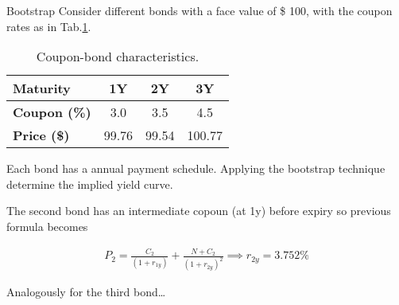 \documentclass{beamer}
\begin{document}
\begin{frame}{}
\begin{block}{Bootstrap}
Consider different bonds with a face value of \$ 100, with the coupon rates as in Tab.\ref{tab:coupons}.

\begin{table}[htb]
  \begin{center}
    \begin{tabular}{|l|c|c|c|}
      \hline
      \textbf{Maturity}    & 1Y    & 2Y     & 3Y     \\ \hline
      \textbf{Coupon (\%)} & 3.0   & 3.5    & 4.5    \\ \hline
      \textbf{Price (\$)}  & 99.76 & 99.54  & 100.77 \\ \hline
    \end{tabular}
    \end{center}
    \caption{Coupon-bond characteristics.}
    \label{tab:coupons}
  \end{table}
Each bond has a annual payment schedule. Applying the bootstrap technique determine the implied yield curve.
\end{block}
\end{frame}

\begin{frame}{}
The second bond has an intermediate copoun (at 1y) before expiry so previous formula becomes

\begin{equation*}
  \begin{gathered}
    P_2 = \frac{C_2}{(1+r_{1y})} + \frac{N + C_2}{(1+r_{2y})^2} \implies r_{2y} = 3.752 \%
  \end{gathered}
\end{equation*}

Analogously for the third bond\ldots
\end{frame}
\end{document}

